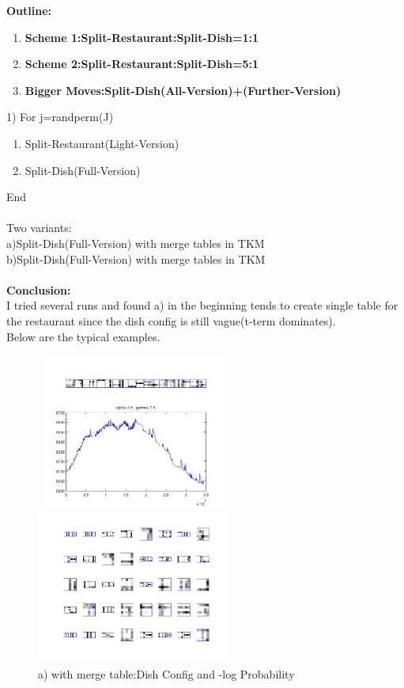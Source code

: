 \documentclass{article}
\begin{document}
\begin{spacing}{1.1}
{\bf Outline:}
\begin{enumerate}
\item {\bf Scheme 1:Split-Restaurant:Split-Dish=1:1}
\item {\bf Scheme 2:Split-Restaurant:Split-Dish=5:1}
\item {\bf Bigger Moves:Split-Dish(All-Version)+(Further-Version)}
\end{enumerate}
1) For j=randperm(J) 
\begin{enumerate}
\item Split-Restaurant(Light-Version) 
\item Split-Dish(Full-Version)
\end{enumerate}
End\\ \\
Two variants:\\
a)Split-Dish(Full-Version) with merge tables in TKM\\
b)Split-Dish(Full-Version) with merge tables in TKM\\ \\
{\bf Conclusion:}\\I tried several runs and found a) in the beginning tends to create single table for the restaurant since the 
dish config is still vague(t-term dominates).\\
Below are the typical examples.
\begin{figure}[h] 
  \begin{minipage}[b]{0.5\textwidth} 
    \centering 
    \includegraphics[width=2.5in,height=2in]{init1_5_mt40.jpg} 
    \caption{a) with merge table:Dish Config and -log Probability}
    \label{fig:by:table} 
  \end{minipage}%
  \begin{minipage}[b]{0.5\textwidth} 
    \centering 
    \includegraphics[width=2.5in,height=2in]{init1_5_mt40d.jpg} 

\end{minipage}
\end{figure}
\end{spacing}
\end{document}
